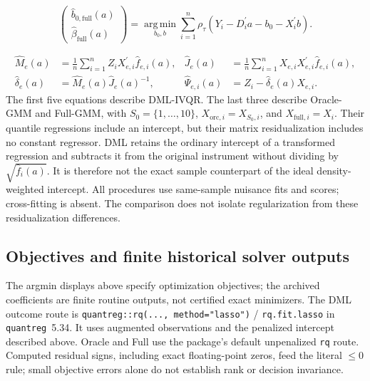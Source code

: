 \begin{equation}
    \begin{pmatrix}
        \widehat b_{0,\mathrm{full}}(a)\\
        \widehat\beta_{\mathrm{full}}(a)
    \end{pmatrix}
    =
    \operatorname*{arg\,min}_{b_0,b}
    \sum_{i=1}^{n}
    \rho_{\tau}\!\left(
        Y_i-D_i^{\prime}a-b_0-X_i^{\prime}b
    \right).
    \label{eq:full-beta}
\end{equation}

\begin{equation}
    \begin{aligned}
        \widehat M_e(a)
        &=\frac{1}{n}\sum_{i=1}^{n}
          Z_iX_{e,i}^{\prime}\widehat f_{e,i}(a),&
        \widehat J_e(a)
        &=\frac{1}{n}\sum_{i=1}^{n}
          X_{e,i}X_{e,i}^{\prime}\widehat f_{e,i}(a),\\
        \widehat\delta_e(a)
        &=\widehat M_e(a)\widehat J_e(a)^{-1},&
        \widehat\Psi_{e,i}(a)
        &=Z_i-\widehat\delta_e(a)X_{e,i}.
    \end{aligned}
    \label{eq:benchmark-residualization}
\end{equation}
The first five equations describe DML-IVQR. The last three describe Oracle-GMM and Full-GMM, with $S_0=\{1,\ldots,10\}$, $X_{\mathrm{orc},i}=X_{S_0,i}$, and $X_{\mathrm{full},i}=X_i$. Their quantile regressions include an intercept, but their matrix residualization includes no constant regressor. DML retains the ordinary intercept of a transformed regression and subtracts it from the original instrument without dividing by $\sqrt{\widehat f_i(a)}$. It is therefore not the exact sample counterpart of the ideal density-weighted intercept. All procedures use same-sample nuisance fits and scores; cross-fitting is absent. The comparison does not isolate regularization from these residualization differences.

\subsection{Objectives and finite historical solver outputs}
\label{app:finite-solvers}
The argmin displays above specify optimization objectives; the archived coefficients are finite routine outputs, not certified exact minimizers. The DML outcome route is \texttt{quantreg::rq(..., method="lasso")} / \texttt{rq.fit.lasso} in \texttt{quantreg}~5.34. It uses augmented observations and the penalized intercept described above. Oracle and Full use the package's default unpenalized \texttt{rq} route. Computed residual signs, including exact floating-point zeros, feed the literal $\leq0$ rule; small objective errors alone do not establish rank or decision invariance.

